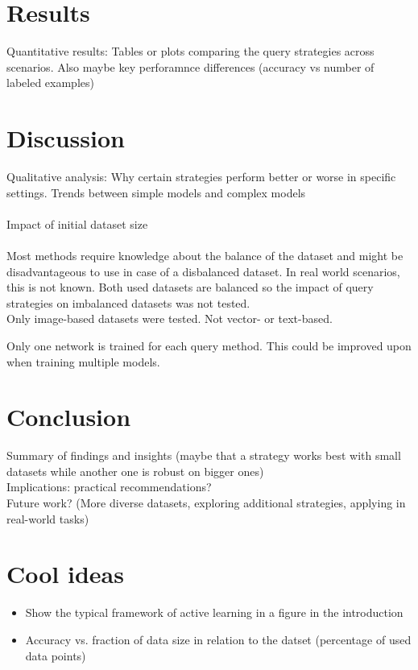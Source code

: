 \documentclass{article}
\theoremstyle{plain}
\theoremstyle{definition}
\theoremstyle{remark}
\begin{document}
\section{Results}\label{sec:results}
Quantitative results: Tables or plots comparing the query strategies across scenarios. Also maybe key perforamnce differences (accuracy vs number of labeled examples)

\section{Discussion}\label{sec:discussion}
Qualitative analysis: Why certain strategies perform better or worse in specific settings. Trends between simple models and complex models
\\
\\
Impact of initial dataset size
\\
\\
Most methods require knowledge about the balance of the dataset and might be disadvantageous to use in case of a disbalanced dataset. In real world scenarios, this is not known. Both used datasets are balanced so the impact of query strategies on imbalanced datasets was not tested. \\
Only image-based datasets were tested. Not vector- or text-based. 

Only one network is trained for each query method. This could be improved upon when training multiple models.

\section{Conclusion}\label{sec:conclusion}
Summary of findings and insights (maybe that a strategy works best with small datasets while another one is robust on bigger ones)
\\
Implications: practical recommendations?
\\
Future work? (More diverse datasets, exploring additional strategies, applying in real-world tasks)

\newpage

\section{Cool ideas}
\begin{itemize}
	\item Show the typical framework of active learning in a figure in the introduction
	\item Accuracy vs. fraction of data size in relation to the datset (percentage of used data points)
\end{itemize}
\end{document}
